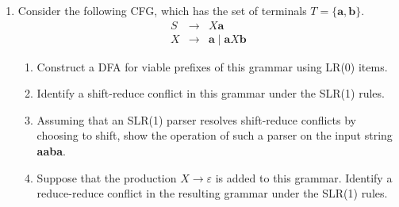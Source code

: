 \documentclass[11pt]{article}
\begin{document}
\begin{enumerate}
	\item Consider the following CFG, which has the set of terminals
		$T = \{ \textbf{a}, \textbf{b} \}$.
		\begin{eqnarray*}
			S & \rightarrow & X \textbf{a} \\
			X & \rightarrow & \textbf{a} \mid \textbf{a} X \textbf{b}
		\end{eqnarray*}
	
		\begin{enumerate}
			\item Construct a DFA for viable prefixes of this grammar using LR(0)
				items.
			\item Identify a shift-reduce conflict in this grammar under the
				SLR(1) rules.
			\item Assuming that an SLR(1) parser resolves shift-reduce conflicts
				by choosing to shift, show the operation of such a parser on the input
				string \textbf{aaba}.
			\item Suppose that the production $X \rightarrow \varepsilon$ is added
				to this grammar.  Identify a reduce-reduce conflict in the resulting
				grammar under the SLR(1) rules.
		\end{enumerate}
	
\end{enumerate}
\end{document}
